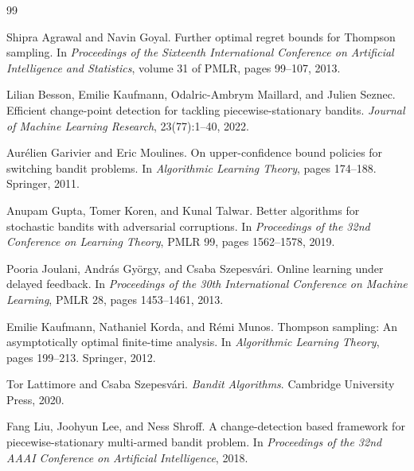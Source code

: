 \documentclass[11pt]{article}
\begin{document}

\begin{thebibliography}{99}

Shipra Agrawal and Navin Goyal.
\newblock Further optimal regret bounds for Thompson sampling.
\newblock In \emph{Proceedings of the Sixteenth International Conference on Artificial Intelligence and Statistics}, volume 31 of PMLR, pages 99--107, 2013.

Lilian Besson, Emilie Kaufmann, Odalric-Ambrym Maillard, and Julien Seznec.
\newblock Efficient change-point detection for tackling piecewise-stationary bandits.
\newblock \emph{Journal of Machine Learning Research}, 23(77):1--40, 2022.

Aur\'elien Garivier and Eric Moulines.
\newblock On upper-confidence bound policies for switching bandit problems.
\newblock In \emph{Algorithmic Learning Theory}, pages 174--188. Springer, 2011.

Anupam Gupta, Tomer Koren, and Kunal Talwar.
\newblock Better algorithms for stochastic bandits with adversarial corruptions.
\newblock In \emph{Proceedings of the 32nd Conference on Learning Theory}, PMLR 99, pages 1562--1578, 2019.

Pooria Joulani, Andr\'as Gy\"orgy, and Csaba Szepesv\'ari.
\newblock Online learning under delayed feedback.
\newblock In \emph{Proceedings of the 30th International Conference on Machine Learning}, PMLR 28, pages 1453--1461, 2013.

Emilie Kaufmann, Nathaniel Korda, and R\'emi Munos.
\newblock Thompson sampling: An asymptotically optimal finite-time analysis.
\newblock In \emph{Algorithmic Learning Theory}, pages 199--213. Springer, 2012.

Tor Lattimore and Csaba Szepesv\'ari.
\newblock \emph{Bandit Algorithms}.
\newblock Cambridge University Press, 2020.

Fang Liu, Joohyun Lee, and Ness Shroff.
\newblock A change-detection based framework for piecewise-stationary multi-armed bandit problem.
\newblock In \emph{Proceedings of the 32nd AAAI Conference on Artificial Intelligence}, 2018.


\end{thebibliography}
\end{document}
